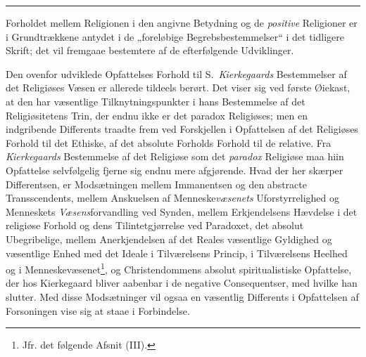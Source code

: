 \begin{center}\rule{2cm}{0.4pt}\end{center}

Forholdet mellem Religionen i den angivne Betydning og de \emph{positive}
Religioner er i Grundtrækkene antydet i de „foreløbige Begrebsbestemmelser“ i
det tidligere Skrift; det vil fremgaae bestemtere af de efterfølgende
Udviklinger.

Den ovenfor udviklede Opfattelses Forhold til S.\ \emph{Kierkegaards}
Bestemmelser af det Religiøses Væsen er
 \setcounter{footnote}{0}%
allerede tildeels berørt. Det viser sig ved første Øiekast, at den har
væsentlige Tilknytningspunkter i hans Bestemmelse af det Religiøsitetens Trin,
der endnu ikke er det paradox Religiøses; men en indgribende Differents traadte
frem ved Forskjellen i Opfattelsen af det Religiøses Forhold til det Ethiske,
af det absolute Forholds Forhold til de relative. Fra \emph{Kierkegaards}
Bestemmelse af det Religiøse som det \emph{paradox} Religiøse maa hiin
Opfattelse selvfølgelig fjerne sig endnu mere afgjørende. Hvad der her skærper
Differentsen, er Modsætningen mellem Immanentsen og den abstracte
Transscendents, mellem Anskuelsen af Menneske\emph{væsenets} Uforstyrrelighed
og Menneskets \emph{Væsens}forvandling ved Synden, mellem Erkjendelsens
Hævdelse i det religiøse Forhold og dens Tilintetgjørrelse ved Paradoxet, det
absolut Ubegribelige, mellem Anerkjendelsen af det Reales væsentlige Gyldighed
og væsentlige Enhed med det Ideale i Tilværelsens Princip, i Tilværelsens
Heelhed og i Menneskevæsenet\footnote{Jfr. det følgende Afsnit (III).}, og
Christendommens absolut spiritualistiske Opfattelse, der hos Kierkegaard bliver
aabenbar i de negative Consequentser, med hvilke han slutter. Med disse
Modsætninger vil ogsaa en væsentlig Differents i Opfattelsen af Forsoningen
vise sig at staae i Forbindelse.

